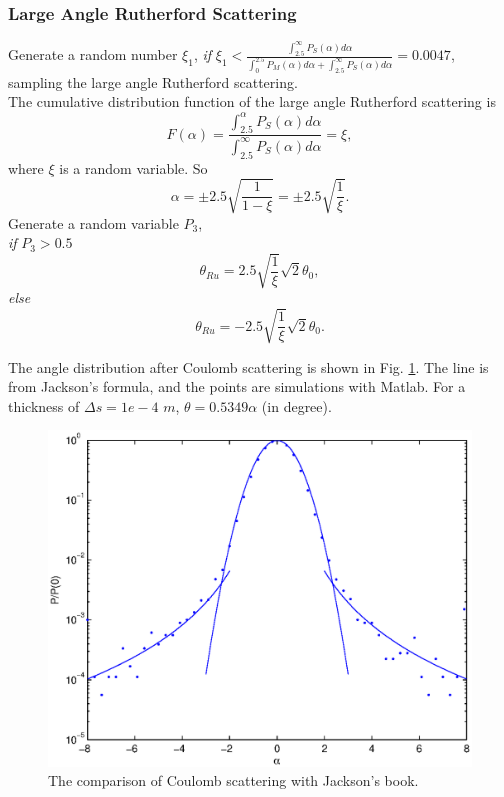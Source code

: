 \documentclass{article}
\begin{document}
\subsubsection{Large Angle Rutherford Scattering}

Generate a random number $\xi_1$, \textit{if} $\xi_1<\frac{\int_{2.5}^\infty P_S(\alpha)d\alpha}{\int_0^{2.5} P_M(\alpha)d\alpha+\int_{2.5}^\infty P_S(\alpha)d\alpha}=0.0047$, sampling the large angle
Rutherford scattering.\\
The cumulative distribution function of the large angle
Rutherford scattering is
\begin{equation}
\label{eq:Fa}
F(\alpha)=\frac{\int_{2.5}^\alpha P_S(\alpha) d \alpha}{\int_{2.5}^\infty P_S(\alpha) d \alpha}=\xi,
\end{equation}
where $\xi$ is a random variable. So
\begin{equation}
\label{eq:alpha}
\alpha=\pm 2.5 \sqrt{\frac{1}{1-\xi}}=\pm 2.5 \sqrt{\frac{1}{\xi}}.
\end{equation}
Generate a random variable $P_3$,\\
\textit{if} $P_3>0.5$
\begin{equation}
   \theta_{Ru}=2.5 \sqrt{\frac{1}{\xi}} \sqrt{2}\theta_0,
\end{equation}
\textit{else}
\begin{equation}
       \theta_{Ru}=-2.5 \sqrt{\frac{1}{\xi}} \sqrt{2}\theta_0.
\end{equation}
 
The angle distribution after Coulomb scattering is shown in Fig. \ref{fig:Coulomb}.
The line is from Jackson's formula, and the points are simulations with Matlab.
For a thickness of $\Delta s=1e-4$ $m$, $\theta=0.5349 \alpha$ (in degree).

\begin{figure}[H]
\begin{center}
\includegraphics*[width=1.2\textwidth]{10steps}
\end{center}
\caption{The comparison of Coulomb scattering with Jackson's book. }
\label{fig:Coulomb}
\end{figure}
\end{document}
